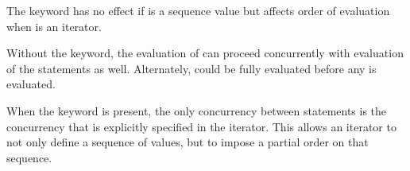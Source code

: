 The keyword  has no effect if  is a
sequence value but affects order of evaluation when  is
an iterator.


Without the  keyword, the evaluation of 
can proceed concurrently with evaluation of the statements as
well. Alternately,  could be fully evaluated before any
 is evaluated.

When the  keyword is present, the only concurrency
between statements is the concurrency that is explicitly specified in
the iterator.  This allows an iterator to not only define a sequence
of values, but to impose a partial order on that sequence.
